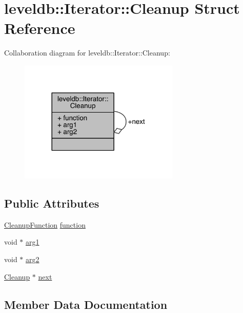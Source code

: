 \hypertarget{structleveldb_1_1_iterator_1_1_cleanup}{}\section{leveldb\+:\+:Iterator\+:\+:Cleanup Struct Reference}
\label{structleveldb_1_1_iterator_1_1_cleanup}


Collaboration diagram for leveldb\+:\+:Iterator\+:\+:Cleanup\+:\nopagebreak
\begin{figure}[H]
\begin{center}
\leavevmode
\includegraphics[width=216pt]{structleveldb_1_1_iterator_1_1_cleanup__coll__graph}
\end{center}
\end{figure}
\subsection*{Public Attributes}
\begin{DoxyCompactItemize}
\item 
\hyperlink{classleveldb_1_1_iterator_ae40c9eedd82a722d24fde1fd8bee4afa}{Cleanup\+Function} \hyperlink{structleveldb_1_1_iterator_1_1_cleanup_aa8a4f34ac312e21d83db4457bba40301}{function}
\item 
void $\ast$ \hyperlink{structleveldb_1_1_iterator_1_1_cleanup_a4f60a8f4786f1d8fbcf5b2039c8e39bc}{arg1}
\item 
void $\ast$ \hyperlink{structleveldb_1_1_iterator_1_1_cleanup_a957ccaa98c380048c59658542e419e89}{arg2}
\item 
\hyperlink{structleveldb_1_1_iterator_1_1_cleanup}{Cleanup} $\ast$ \hyperlink{structleveldb_1_1_iterator_1_1_cleanup_a9dea82023286b2ff15a1657bc22ed63c}{next}
\end{DoxyCompactItemize}


\subsection{Member Data Documentation}
\hypertarget{structleveldb_1_1_iterator_1_1_cleanup_a4f60a8f4786f1d8fbcf5b2039c8e39bc}{}
